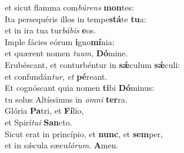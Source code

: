 \oddverse et sicut flamma com\textit{bú}\textit{rens} \textbf{mon}tes:\\
\evenverse Ita persequéris illos in tempe\textbf{stá}te \textbf{tu}a:~\*\\
\evenverse et in ira tua tur\textit{bá}\textit{bis} \textbf{e}os.\\
\oddverse Imple fácies eórum \textbf{i}gno\textbf{mí}nia:~\*\\
\oddverse et quærent nomen \textit{tu}\textit{um}, \textbf{Dó}mine.\\
\evenverse Erubéscant, et conturbéntur in \textbf{sǽ}culum \textbf{sǽ}culi:~\*\\
\evenverse et confundán\textit{tur}, \textit{et} \textbf{pé}reant.\\
\oddverse Et cognóscant quia nomen \textbf{ti}bi \textbf{Dó}minus:~\*\\
\oddverse tu solus Altíssimus in \textit{om}\textit{ni} \textbf{ter}ra.\\
\evenverse Glória \textbf{Pa}tri, et \textbf{Fí}lio,~\*\\
\evenverse et Spirí\textit{tu}\textit{i} \textbf{San}cto.\\
\oddverse Sicut erat in princípio, et \textbf{nunc}, et \textbf{sem}per,~\*\\
\oddverse et in sǽcula sæcu\textit{ló}\textit{rum}. \textbf{A}men.\\
